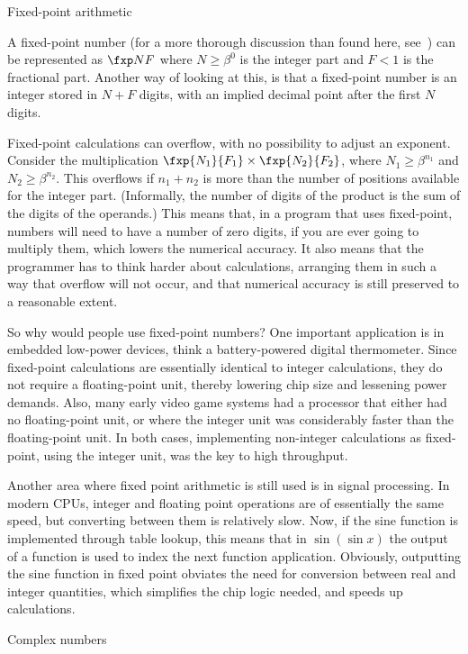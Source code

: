  {Fixed-point arithmetic}

A fixed-point number (for a more thorough discussion than found here,
see~\cite{YatesFixedPoint}) can be represented as $\fxp NF$ where
$N\geq\beta^0$ is the integer part and $F<1$ is the fractional
part. Another way of looking at this, is that a fixed-point number is
an integer stored in $N+F$ digits, with an implied decimal point after
the first $N$ digits.

Fixed-point calculations can overflow, with no possibility to adjust
an exponent. Consider the multiplication $\fxp{N_1}{F_1}\times
\fxp{N_2}{F_2}$, where $N_1\geq \beta^{n_1}$ and $N_2\geq
\beta^{n_2}$. This overflows if $n_1+n_2$ is more than the number of
positions available for the integer part. (Informally, the number of
digits of the product is the sum of the digits of the operands.)
This means that, in a program
that uses fixed-point, numbers will need to have a number of zero
digits, if you are ever going to multiply them, 
which lowers the numerical accuracy.
It also means that the programmer has to think harder about
calculations, arranging them in such a way that overflow will not
occur, and that numerical accuracy is still preserved to a reasonable
extent.

So why would people use fixed-point numbers? One important application
is in embedded low-power devices, think a battery-powered digital
thermometer. Since fixed-point calculations are essentially identical
to integer calculations, they do not require a floating-point unit,
thereby lowering chip size and lessening power demands. Also, many
early video game systems had a processor that either had no
floating-point unit, or where the integer unit was considerably faster
than the floating-point unit. In both cases, implementing non-integer
calculations as fixed-point, using the integer unit, was the key to
high throughput. 

Another area where fixed point arithmetic is still used is in signal
processing. In modern CPUs, integer and floating point operations
are of essentially the same speed, but converting between them is
relatively slow. Now, if the sine function is implemented through
table lookup, this means that in $\sin(\sin x)$ 
the output of a function is used to index the next function
application. Obviously, outputting the sine function in fixed point
obviates the need for conversion between real and integer quantities,
which simplifies the chip logic needed, and speeds up calculations.

 {Complex numbers}
\label{sec:complex}

